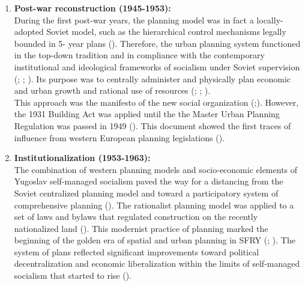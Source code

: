 \documentclass[11pt]{report}
\begin{document}
\begin{enumerate}
\item \textbf{Post-war reconstruction (1945-1953):}
\\
During the first post-war years, the planning model was in fact a locally-adopted Soviet model, such as the hierarchical control mechanisms legally bounded in 5- year plans (\href{Vujosevic}{\citealt{vujosevic_planning_2006}}).
Therefore, the urban planning system functioned in the top-down tradition and in compliance with the contemporary institutional and ideological frameworks of socialism under Soviet supervision (\href{Dawson}{\citealt{dawson_yugoslavia_1987}}; \href{Papic}{\citealt{papic_z._stanje_1988}}; \href{Peric}{\citealt{peric_evolution_2016}}).
Its purpose was to centrally administer and physically plan economic and urban growth and rational use of resources (\href{Dawson}{\citealt{dawson_yugoslavia_1987}}; \href{Papic}{\citealt{papic_z._stanje_1988}}; \href{Vujosevic}{\citealt{vujosevic_planning_2006}}). 
\\

This approach was the manifesto of the new social organization (\href{Dobrovic}{\citealt{dobrovic_konture_1946}};\href{Nedovic}{\citealt{nedovicbudic_waves_2006}}).
However, the 1931 Building Act was applied until the the Master Urban Planning Regulation was passed in 1949 (\href{Nedovic}{\citealt{nedovicbudic_waves_2006}}).
This document showed the first traces of influence from western European planning legislations (\href{Peric}{\citealt{peric_evolution_2016}}).

\item \textbf{Institutionalization (1953-1963):}
\\
The combination of western planning models and socio-economic elements of Yugoslav self-managed socialism paved the way for a distancing from the Soviet centralized planning model and toward a participatory system of comprehensive planning
(\href{Nedovic}{\citealt{nedovic-budic_mornings_2011}}).
The rationalist planning model was applied to a set of laws and bylaws that regulated construction on the recently nationalized land (\href{Vesna}{\citealt{cagic_zakoni_2014}}).
This modernist practice of planning marked the beginning of the golden era of spatial and urban planning in SFRY
(\href{Vujosevic}{\citealt{vujosevic_racionalnost_2004}}; \href{Nedovic}{\citealt{nedovicbudic_waves_2006}}).
The system of plans reflected significant improvements toward political decentralization and economic liberalization within the limits of self-managed socialism that started to rise (\href{Peric}{\citealt{peric_evolution_2016}}).


\end{enumerate}
\end{document}
